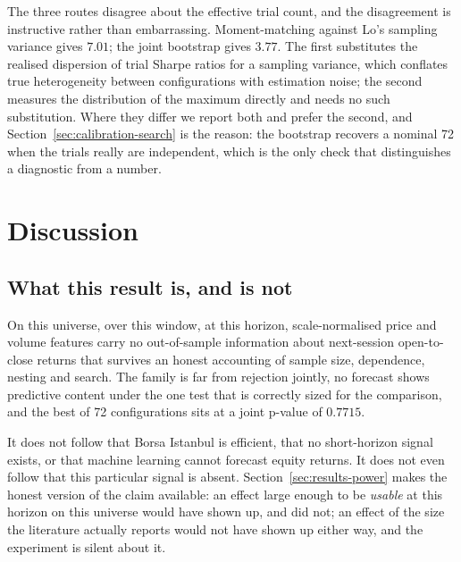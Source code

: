 \documentclass{article}
\theoremstyle{plain}
\theoremstyle{remark}
\begin{document}
The three routes disagree about the effective trial count, and the disagreement
is instructive rather than embarrassing. Moment-matching against Lo's sampling
variance gives $7.01$; the joint bootstrap gives $3.77$. The first substitutes
the realised dispersion of trial Sharpe ratios for a sampling variance, which
conflates true heterogeneity between configurations with estimation noise; the
second measures the distribution of the maximum directly and needs no such
substitution. Where they differ we report both and prefer the second, and
Section~\ref{sec:calibration-search} is the reason: the bootstrap recovers a
nominal 72 when the trials really are independent, which is the only check that
distinguishes a diagnostic from a number.

\section{Discussion}

\subsection{What this result is, and is not}

On this universe, over this window, at this horizon, scale-normalised price and
volume features carry no out-of-sample information about next-session
open-to-close returns that survives an honest accounting of sample size,
dependence, nesting and search. The family is far from rejection jointly, no
forecast shows predictive content under the one test that is correctly sized for
the comparison, and the best of 72 configurations sits at a joint p-value of
$0.7715$.

It does not follow that Borsa Istanbul is efficient, that no short-horizon signal
exists, or that machine learning cannot forecast equity returns. It does not even
follow that this particular signal is absent. Section~\ref{sec:results-power}
makes the honest version of the claim available: an effect large enough to be
\emph{usable} at this horizon on this universe would have shown up, and did not;
an effect of the size the literature actually reports would not have shown up
either way, and the experiment is silent about it.
\end{document}
